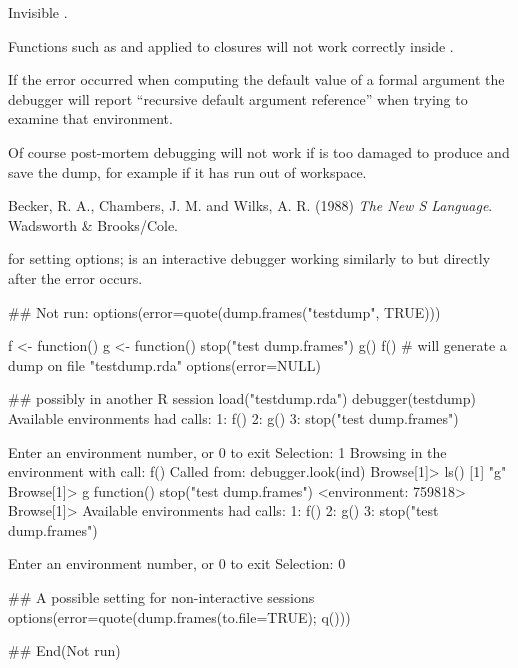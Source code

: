 %
\begin{Value}
Invisible .
\end{Value}
%
\begin{Note}\relax
Functions such as  and
 applied to closures will not work correctly
inside .

If the error occurred when computing the default value of a formal
argument the debugger will report ``recursive default argument
reference'' when trying to examine that environment.

Of course post-mortem debugging will not work if \R{} is too damaged to
produce and save the dump, for example if it has run out of workspace.
\end{Note}
%
\begin{References}\relax
Becker, R. A., Chambers, J. M. and Wilks, A. R. (1988)
\emph{The New S Language}.
Wadsworth \& Brooks/Cole.
\end{References}
%
\begin{SeeAlso}\relax
{} for setting  options;
 is an interactive debugger working similarly to
 but directly after the error occurs.
\end{SeeAlso}
%
\begin{Examples}
\begin{ExampleCode}
## Not run: 
options(error=quote(dump.frames("testdump", TRUE)))

f <- function() {
    g <- function() stop("test dump.frames")
    g()
}
f()   # will generate a dump on file "testdump.rda"
options(error=NULL)

## possibly in another R session
load("testdump.rda")
debugger(testdump)
Available environments had calls:
1: f()
2: g()
3: stop("test dump.frames")

Enter an environment number, or 0 to exit
Selection: 1
Browsing in the environment with call:
f()
Called from: debugger.look(ind)
Browse[1]> ls()
[1] "g"
Browse[1]> g
function() stop("test dump.frames")
<environment: 759818>
Browse[1]> 
Available environments had calls:
1: f()
2: g()
3: stop("test dump.frames")

Enter an environment number, or 0 to exit
Selection: 0

## A possible setting for non-interactive sessions
options(error=quote({dump.frames(to.file=TRUE); q()}))

## End(Not run)
\end{ExampleCode}
\end{Examples}
